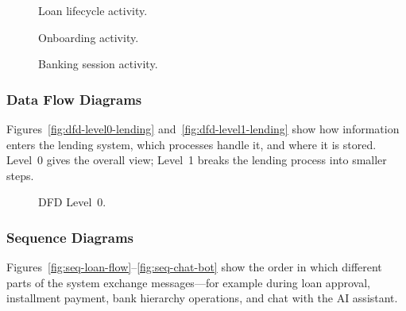 \begin{figure}[H]
\centering
{}
\caption[Loan lifecycle activity]{Loan lifecycle activity.}
\label{fig:act-lending}
\label{fig:act-loan}\label{fig:act-hierarchy}
\end{figure}

\begin{figure}[H]
\centering
{}
\caption[Onboarding activity]{Onboarding activity.}
\label{fig:act-onboarding}
\label{fig:act-income}\label{fig:act-profile}
\end{figure}

\begin{figure}[H]
\centering
{}
\caption[Banking session activity]{Banking session activity.}
\label{fig:act-aux}
\label{fig:act-chat}\label{fig:act-aichatbot}\label{fig:act-market}
\end{figure}

\subsubsection{Data Flow Diagrams}

Figures~\ref{fig:dfd-level0-lending} and~\ref{fig:dfd-level1-lending} show how information enters the lending system, which processes handle it, and where it is stored. Level~0 gives the overall view; Level~1 breaks the lending process into smaller steps.

\begin{figure}[H]
\centering
{}
\caption[DFD Level~0]{DFD Level~0.}
\label{fig:dfd-level0-lending}
\label{fig:dfd-context}
\end{figure}

\caption[DFD Level~1]{DFD Level~1.}
\label{fig:dfd-level1-lending}
\label{fig:dfd-suite}
\label{fig:dfd-level1a}
\LandscapeDiagramEnd

\subsubsection{Sequence Diagrams}

Figures~\ref{fig:seq-loan-flow}--\ref{fig:seq-chat-bot} show the order in which different parts of the system exchange messages---for example during loan approval, installment payment, bank hierarchy operations, and chat with the AI assistant.

